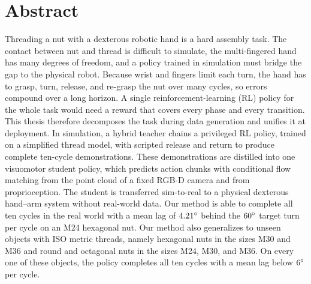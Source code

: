 %
\thispagestyle{empty}%
%
\vspace*{2cm}%
\section*{\color{TUMBlack}Abstract}%
Threading a nut with a dexterous robotic hand is a hard assembly task. The contact between nut and thread is difficult to simulate, the multi-fingered hand has many degrees of freedom, and a policy trained in simulation must bridge the gap to the physical robot. Because wrist and fingers limit each turn, the hand has to grasp, turn, release, and re-grasp the nut over many cycles, so errors compound over a long horizon. A single reinforcement-learning (RL) policy for the whole task would need a reward that covers every phase and every transition. This thesis therefore decomposes the task during data generation and unifies it at deployment. In simulation, a hybrid teacher chains a privileged RL policy, trained on a simplified thread model, with scripted release and return to produce complete ten-cycle demonstrations. These demonstrations are distilled into one visuomotor student policy, which predicts action chunks with conditional flow matching from the point cloud of a fixed RGB-D camera and from proprioception. The student is transferred sim-to-real to a physical dexterous hand--arm system without real-world data. Our method is able to complete all ten cycles in the real world with a mean lag of $4.21^\circ$ behind the $60^\circ$ target turn per cycle on an M24 hexagonal nut. Our method also generalizes to unseen objects with ISO metric threads, namely hexagonal nuts in the sizes M30 and M36 and round and octagonal nuts in the sizes M24, M30, and M36. On every one of these objects, the policy completes all ten cycles with a mean lag below $6^\circ$ per cycle.%
%
\clearpage%
\thispagestyle{empty}%
\vspace*{2cm}%
